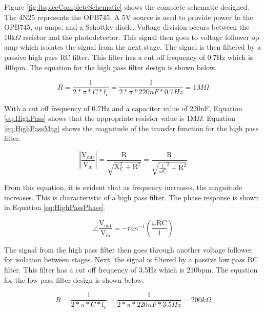 \documentclass[CMPE]{KGCOEReport}
\begin{document}
Figure \ref{fig:ltspiceCompleteSchematic} shows the complete schematic designed. The 4N25 represents the OPB745. A 5V source is used to provide power to the OPB745, op amps, and a Schottky diode. Voltage division occurs between the 10k$\Omega$ rseistor and the photodetector. This signal then goes to voltage follower op amp which isolates the signal from the next stage. The signal is then filtered by a passive high pass RC filter. This filter has a cut off frequency of 0.7Hz which is 40bpm. The equation for the high pass filter design is shown below.

\begin{equation}
R = \frac{1}{2*\pi*C*\text{f}_\text{c}} = \frac{1}{2*\pi*220nF*0.7Hz} = 1M\Omega \label{eq:HighPass}
\end{equation}

With a cut off frequency of 0.7Hz and a capacitor value of 220nF, Equation \ref{eq:HighPass} shows that the appropriate resistor value is 1M$\Omega$. Equation \ref{eq:HighPassMag} shows the magnitude of the transfer function for the high pass filter.

\begin{equation}
|\frac{\text{V}_\text{out}}{\text{V}_\text{in}}| = \frac{\text{R}}{\sqrt{\text{X}_\text{C}^2 + \text{R}^2}} = \frac{\text{R}}{\sqrt{\frac{1}{\omega\text{C}}^2 + \text{R}^2}} \label{eq:HighPassMag}
\end{equation}

From this equation, it is evident that as frequency increases, the magnitude increases. This is characteristic of a high pass filter. The phase response is shown in Equation \ref{eq:HighPassPhase}.

\begin{equation}
\angle\frac{\text{V}_\text{out}}{\text{V}_\text{in}} = -tan^{-1}(\frac{\omega\text{R}\text{C}}{1}) \label{eq:HighPassPhase}
\end{equation}

The signal from the high pass filter then goes through another voltage follower for isolation between stages. Next, the signal is filtered by a passive low pass RC filter. This filter has a cut off frequency of 3.5Hz which is 210bpm.  The equation for the low pass filter design is shown below.

\begin{equation}
R = \frac{1}{2*\pi*C*\text{f}_\text{c}} = \frac{1}{2*\pi*220nF*3.5Hz} = 200k\Omega \label{eq:LowPass}
\end{equation}
\end{document}
